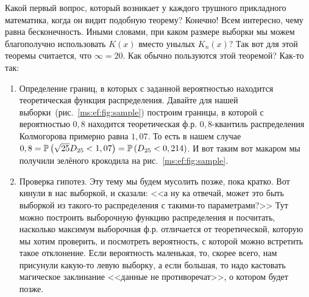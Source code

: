 \documentclass[../TV&MS.tex]{subfiles}
\begin{document}
\begin{Note}
    Какой первый вопрос, который возникает у каждого трушного прикладного математика, когда он видит подобную теорему?
    Конечно! Всем интересно, чему равна бесконечность.
    Иными словами, при каком размере выборки мы можем благополучно использовать $K(x)$ вместо унылых $K_n(x)$?
    Так вот для этой теоремы считается, что $\infty = 20$.
    Как обычно пользуются этой теоремой? Как-то так:
    \begin{enumerate}
        \item Определение границ, в которых с заданной вероятностью находится теоретическая функция распределения.
            Давайте для нашей выборки~(рис.~\ref{ms:ef:fig:sample}) построим границы, в которой с вероятностью $0,8$ находится теоретическая ф.р.
            $0,8$-квантиль распределения Колмогорова примерно равна $1,07$.
            То есть в нашем случае 
            $0,8=\mathbb{P}\left(\sqrt{25}D_{25}<1,07\right)=
            \mathbb{P}\left(D_{25} < 0,214 \right)$.
            И вот таким вот макаром мы получили зелёного крокодила на рис.~\ref{ms:ef:fig:sample}.
        \item Проверка гипотез. Эту тему мы будем мусолить позже, пока кратко.
            Вот кинули в нас выборкой, и сказали: <<а ну ка отвечай, может это
            быть выборкой из такого-то распределения с такими-то параметрами?>>
            Тут можно построить выборочную функцию распределения и посчитать, насколько максимум выборочная ф.р. 
            отличается от теоретической, которую мы хотим проверить, и посмотреть вероятность, 
            с которой можно встретить такое отклонение.
            Если вероятность маленькая, то, скорее всего, нам присунули 
            какую-то левую выборку, а если большая, то надо кастовать 
            магическое заклинание <<данные не противоречат>>, 
            о котором будет позже.
    \end{enumerate} 
\end{Note}
\end{document}
